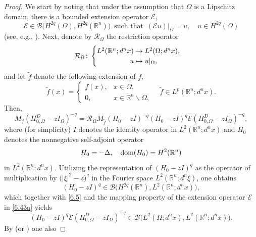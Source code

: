 \documentclass[reqno,10pt, centertags]{amsart}
\newcommand{\bbR}{{\mathbb{R}}}
\newcommand{\cB}{{\mathcal B}}
\newcommand{\cE}{{\mathcal E}}
\newcommand{\cR}{{\mathcal R}}
\newcommand{\abs}[1]{\left\lvert#1\right\rvert}
\newcommand{\lb}{\label}
\newcommand{\ti}{\tilde}
\newcommand{\Om}{\Omega}
\newcommand{\dom}{\text{\rm{dom}}}
\numberwithin{equation}{section}
\theoremstyle{definition}
\begin{document}
\begin{proof}
We start by noting that under the assumption that $\Om$ is a Lipschitz
domain, there is a bounded extension operator $\cE$,
\begin{equation}
\cE\in\cB\big(H^{2q}(\Om),H^{2q}(\bbR^n)\big) \,
\text{ such that } \, (\cE u){|_\Om} = u, \quad u\in H^{2q}(\Om)
\lb{6.43a}
\end{equation}
(see, e.g., \cite[Theorem\ A.4]{Mc00}). Next, denote by $\cR_{\Om}$ the
restriction operator
\begin{equation}
\cR_{\Om}\colon \begin{cases} L^2(\bbR^n;d^nx) \to L^2(\Om;d^nx), \\
\hspace*{1.65cm}u \mapsto u|_{\Om}, \end{cases}
\end{equation}
and let $\ti f$ denote the following extension of $f$,
\begin{equation}
\ti f(x) =
\begin{cases}f(x), & x\in\Om, \\ 0, &
x\in\bbR^n\backslash\Om, \end{cases} \quad  \ti f\in
L^p(\bbR^n;d^nx).
\end{equation}
Then,
\begin{equation} \lb{6.14}
M_f (H_{0,\Om}^D-zI_{\Om})^{-q}= \cR_\Om M_{\ti f}
(H_{0}-zI)^{-q}(H_{0}-zI)^{q}\cE (H_{0,\Om}^D-zI_{\Om})^{-q},
\end{equation}
where (for simplicity) $I$ denotes the identity operator in
$L^2(\bbR^n;d^nx)$ and $H_0$ denotes the nonnegative self-adjoint operator
\begin{equation}
H_0 = -\Delta, \quad \dom(H_0)=H^{2}(\bbR^n)
\end{equation}
in $L^2(\bbR^n;d^nx)$. Utilizing the representation of $(H_{0}-zI)^{q}$ as
the operator of multiplication by $\big(\abs{\xi}^2-z\big)^{q}$ in the
Fourier space $L^2(\bbR^n;d^n\xi)$, one obtains
\begin{equation}
(H_{0}-zI)^{q}\in\cB\big(H^{2q}(\bbR^n),L^2(\bbR^n;d^nx)\big),  \lb{6.51a}
\end{equation}
which together with \eqref{6.5} and the mapping property of the
extension operator $\cE$ in \eqref{6.43a} yields
\begin{equation}
(H_{0}-zI)^{q}\cE (H_{0,\Om}^D-zI_{\Om})^{-q}\in
\cB\big(L^2(\Om;d^nx),L^2(\bbR^n;d^nx)\big). \lb{6.15}
\end{equation}
By  \cite[Theorem 4.1]{Si79} (or \cite[Theorem XI.20]{RS79}) one also

\end{proof}
\end{document}
